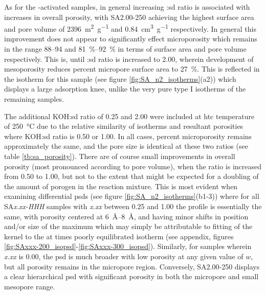 As for the -activated samples, in general increasing :\acrshort{sd} ratio is associated with increases in overall porosity, with SA2.00-250 achieving the highest surface area and pore volume of \qty{2396}{\metre\squared\per\gram} and \qty{0.84}{\cm\cubed\per\gram} respectively. In general this improvement does not appear to significantly effect microporosity which remains in the range \numrange[range-phrase={-}]{88}{94} and \qtyrange[range-units=single, range-phrase={-}]{81}{92}{\percent} in terms of surface area and pore volume respectively. This is, until :\acrshort{sd} ratio is increased to \num{2.00}, wherein development of mesoporosity reduces percent micropore surface area to \qty{27}{\percent}. This is reflected in the  isotherm for this sample (see figure \ref{fig:SA_n2_isotherms}(a2)) which displays a large \gls{adsorption} knee, unlike the very pure type I isotherms\citep{Thommes2015Physisorption} of the remaining samples.

The additional KOH:\acrshort{sd} ratio of 0.25 and 2.00 were included at \gls{htc} temperature of \qty{250}{\degreeCelsius} due to the relative similarity of isotherms and resultant porosities where KOH:\acrshort{sd} ratio is 0.50 or 1.00. In all cases, percent microporosity remains approximately the same, and the pore size is identical at these two ratios (see table \ref{tb:sa_porosity}). There are of course small improvements in overall porosity (most pronounced according to pore volume), when the ratio is increased from 0.50 to 1.00, but not to the extent that might be expected for a doubling of the amount of \gls{porogen} in the reaction mixture. This is most evident when examining differential \glspl{psd} (see figure \ref{fig:SA_n2_isotherms}(b1-3)) where for all SA\textit{x.xx-HHH} samples with \textit{x.xx} between 0.25 and 1.00 the profile is essentially the same, with porosity centered at \qtyrange[range-units=single, range-phrase={-}]{6}{8}{\angstrom}, and having minor shifts in position and/or size of the maximum which may simply be attributable to fitting of the kernel to the at times poorly equilibrated isotherm (see appendix, figures \ref{fig:SAxxx-200_isopsd}-\ref{fig:SAxxx-300_isopsd}). Similarly, for samples wherein \textit{x.xx} is 0.00, the \gls{psd} is much broader with low porosity at any given value of $w$, but all porosity remains in the \gls{micropore} region. Conversely, SA2.00-250 displays a clear hierarchical \gls{psd} with significant porosity in both the \gls{micropore} and small \gls{mesopore} range. 


